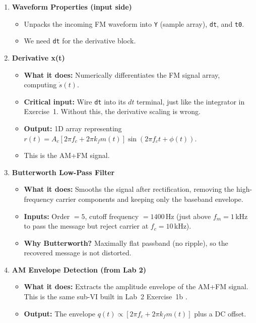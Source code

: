 \documentclass[../../main.tex]{subfiles}
\begin{document}
\begin{enumerate}[leftmargin=2em]

\item \textbf{Waveform Properties (input side)}
  \begin{itemize}[leftmargin=1.5em]
    \item Unpacks the incoming FM waveform into \texttt{Y} (sample array), \texttt{dt}, and \texttt{t0}.
    \item We need \texttt{dt} for the derivative block.
  \end{itemize}

\item \textbf{Derivative x(t)}
  \begin{itemize}[leftmargin=1.5em]
    \item \textbf{What it does:} Numerically differentiates the FM signal array, computing $\dot{s}(t)$.
    \item \textbf{Critical input:} Wire \texttt{dt} into its $dt$ terminal, just like the integrator in Exercise~1. Without this, the derivative scaling is wrong.
    \item \textbf{Output:} 1D array representing $r(t) = A_c[2\pi f_c + 2\pi k_f m(t)]\sin(2\pi f_c t + \phi(t))$.
    \item This is the AM+FM signal.
  \end{itemize}

\item \textbf{Butterworth Low-Pass Filter}
  \begin{itemize}[leftmargin=1.5em]
    \item \textbf{What it does:} Smooths the signal after rectification, removing the high-frequency carrier components and keeping only the baseband envelope.
    \item \textbf{Inputs:} Order $= 5$, cutoff frequency $= 1400$\,Hz (just above $f_m = 1$\,kHz to pass the message but reject carrier at $f_c = 10$\,kHz).
    \item \textbf{Why Butterworth?} Maximally flat passband (no ripple), so the recovered message is not distorted.
  \end{itemize}

\item \textbf{AM Envelope Detection (from Lab 2)}
  \begin{itemize}[leftmargin=1.5em]
    \item \textbf{What it does:} Extracts the amplitude envelope of the AM+FM signal. This is the same sub-VI built in Lab~2 Exercise~1b .
    \item \textbf{Output:} The envelope $q(t) \propto [2\pi f_c + 2\pi k_f m(t)]$ plus a DC offset.
  \end{itemize}


\end{enumerate}
\end{document}
